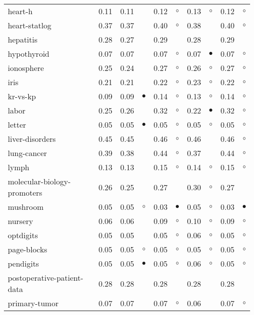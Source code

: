 {\begin{longtable}{lrr@{\hspace{0.1cm}}cr@{\hspace{0.1cm}}cr@{\hspace{0.1cm}}cr@{\hspace{0.1cm}}c}
heart-h & 0.11 & 0.11 &           & 0.12 &   $\circ$ & 0.13 &   $\circ$ & 0.12 &   $\circ$\\
heart-statlog & 0.37 & 0.37 &           & 0.40 &   $\circ$ & 0.38 &           & 0.40 &   $\circ$\\
hepatitis & 0.28 & 0.27 &           & 0.29 &           & 0.28 &           & 0.29 &          \\
hypothyroid & 0.07 & 0.07 &           & 0.07 &   $\circ$ & 0.07 & $\bullet$ & 0.07 &   $\circ$\\
ionosphere & 0.25 & 0.24 &           & 0.27 &   $\circ$ & 0.26 &   $\circ$ & 0.27 &   $\circ$\\
iris & 0.21 & 0.21 &           & 0.22 &   $\circ$ & 0.23 &   $\circ$ & 0.22 &   $\circ$\\
kr-vs-kp & 0.09 & 0.09 & $\bullet$ & 0.14 &   $\circ$ & 0.13 &   $\circ$ & 0.14 &   $\circ$\\
labor & 0.25 & 0.26 &           & 0.32 &   $\circ$ & 0.22 & $\bullet$ & 0.32 &   $\circ$\\
letter & 0.05 & 0.05 & $\bullet$ & 0.05 &   $\circ$ & 0.05 &   $\circ$ & 0.05 &   $\circ$\\
liver-disorders & 0.45 & 0.45 &           & 0.46 &   $\circ$ & 0.46 &           & 0.46 &   $\circ$\\
lung-cancer & 0.39 & 0.38 &           & 0.44 &   $\circ$ & 0.37 &           & 0.44 &   $\circ$\\
lymph & 0.13 & 0.13 &           & 0.15 &   $\circ$ & 0.14 &   $\circ$ & 0.15 &   $\circ$\\
molecular-biology-promoters & 0.26 & 0.25 &           & 0.27 &           & 0.30 &   $\circ$ & 0.27 &          \\
mushroom & 0.05 & 0.05 &   $\circ$ & 0.03 & $\bullet$ & 0.05 &   $\circ$ & 0.03 & $\bullet$\\
nursery & 0.06 & 0.06 &           & 0.09 &   $\circ$ & 0.10 &   $\circ$ & 0.09 &   $\circ$\\
optdigits & 0.05 & 0.05 &           & 0.05 &   $\circ$ & 0.06 &   $\circ$ & 0.05 &   $\circ$\\
page-blocks & 0.05 & 0.05 &   $\circ$ & 0.05 &   $\circ$ & 0.05 &   $\circ$ & 0.05 &   $\circ$\\
pendigits & 0.05 & 0.05 & $\bullet$ & 0.05 &   $\circ$ & 0.06 &   $\circ$ & 0.05 &   $\circ$\\
postoperative-patient-data & 0.28 & 0.28 &           & 0.28 &           & 0.28 &           & 0.28 &          \\
primary-tumor & 0.07 & 0.07 &           & 0.07 &   $\circ$ & 0.06 &           & 0.07 &   $\circ$\\

\end{longtable}}
